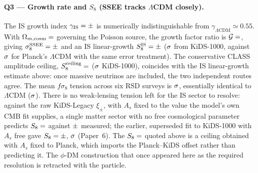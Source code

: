 \documentclass[12pt,a4paper]{article}
\begin{document}
\paragraph{Q3 — Growth rate and $S_8$ (SSEE tracks $\Lambda$CDM closely).}
The IS growth index $\gamma_{\mathrm{IS}} = \val{p3_gamma_IS} \pm \val{p3_gamma_IS_sigma}$
is numerically indistinguishable from $\gamma_{\Lambda\mathrm{CDM}} \simeq 0.55$.
With $\Omega_{m,\mathrm{cosm}} = \val{OMEGA_M_TOTAL_d6}$ governing the Poisson source,
the growth factor ratio is $\mathcal{G} = \val{p5_G}$, giving
$\sigma_8^{\mathrm{SSEE}} = \val{p3_sigma8_IS} \pm \val{p5_sigma8_IS_sigma}$ and an IS linear-growth
$S_8^{\mathrm{IS}} = \val{p3_S8_IS} \pm \val{p5_S8_IS_sigma}$ ($\val{p5_tS8_ssee_kids}\sigma$ from KiDS-1000,
against $\val{p5_tS8_lcdm_kids}\sigma$ for Planck's $\Lambda$CDM with the same error treatment).
The conservative CLASS amplitude ceiling, $S_8^{\mathrm{ceiling}} = \val{p3_S8_techo}$
($\val{tension_s8_kids1000_techo}\sigma$ KiDS-1000), coincides with the IS linear-growth estimate above:
once massive neutrinos are included, the two independent routes agree.
The mean $f\sigma_8$ tension across six RSD surveys is $\val{fs8_tmedia_ssee}\sigma$,
essentially identical to $\Lambda$CDM ($\val{fs8_tmedia_lcdm}\sigma$).
There is no weak-lensing tension left for the IS sector to resolve: against
the raw KiDS-Legacy $\xi_\pm$, with $A_s$ fixed to the value the model's own CMB
fit supplies, a single matter sector with no free cosmological parameter
predicts $S_8 = \val{S8_leg_pred}$ against $\val{S8_legacy_dato}\pm\val{S8_legacy_dato_sigma}$ measured; the earlier, superseded fit to
KiDS-1000 with $A_s$ free gave $S_8 = \val{S8_k1000_ssee}\pm\val{S8_k1000_ssee_sigma}$, $\val{S8_k1000_ssee_tension}\sigma$
(Paper~6).  The $S_8 = \val{p3_S8_IS}$ quoted above is a ceiling obtained with $A_s$
fixed to Planck, which imports the Planck--KiDS offset rather than predicting
it.  The $\phi$-DM construction that once appeared here as the required
resolution is retracted with the particle.
\end{document}
